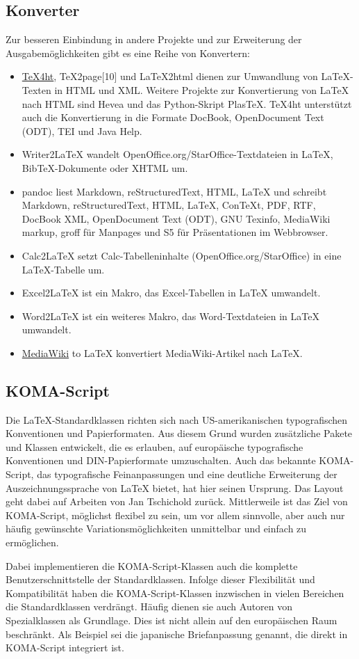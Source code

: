 \subsection{Konverter}
Zur besseren Einbindung in andere Projekte und zur Erweiterung der Ausgabemöglichkeiten gibt es eine Reihe von Konvertern:
\begin{itemize}
	\item \href{https://de.wikipedia.org/wiki/TeX4ht}{TeX4ht}, TeX2page[10] und LaTeX2html dienen zur Umwandlung von LaTeX-Texten in HTML und XML. Weitere Projekte zur Konvertierung von LaTeX nach HTML sind Hevea und das Python-Skript PlasTeX. TeX4ht unterstützt auch die Konvertierung in die Formate DocBook, OpenDocument Text (ODT), TEI und Java Help.
	\item Writer2LaTeX wandelt OpenOffice.org/StarOffice-Textdateien in LaTeX, BibTeX-Dokumente oder XHTML um.
	\item pandoc liest Markdown, reStructuredText, HTML, LaTeX und schreibt Markdown, reStructuredText, HTML, LaTeX, ConTeXt, PDF, RTF, DocBook XML, OpenDocument Text (ODT), GNU Texinfo, MediaWiki markup, groff für Manpages und S5 für Präsentationen im Webbrowser.\cite{pandoc}
	\item Calc2LaTeX setzt Calc-Tabelleninhalte (OpenOffice.org/StarOffice) in eine LaTeX-Tabelle um.
	\item Excel2LaTeX ist ein Makro, das Excel-Tabellen in LaTeX umwandelt.
	\item Word2LaTeX ist ein weiteres Makro, das Word-Textdateien in LaTeX umwandelt.
	\item \href{http://sourceforge.net/p/wb2pdf/git/ci/master/tree/}{MediaWiki} to LaTeX konvertiert MediaWiki-Artikel nach LaTeX.
\end{itemize}

\subsection{KOMA-Script}
Die LaTeX-Standardklassen richten sich nach US-amerikanischen typografischen Konventionen und Papierformaten. Aus diesem Grund wurden zusätzliche Pakete und Klassen entwickelt, die es erlauben, auf europäische typografische Konventionen und DIN-Papierformate umzuschalten. Auch das bekannte KOMA-Script, das typografische Feinanpassungen und eine deutliche Erweiterung der Auszeichnungssprache von LaTeX bietet, hat hier seinen Ursprung. Das Layout geht dabei auf Arbeiten von Jan Tschichold zurück. Mittlerweile ist das Ziel von KOMA-Script, möglichst flexibel zu sein, um vor allem sinnvolle, aber auch nur häufig gewünschte Variationsmöglichkeiten unmittelbar und einfach zu ermöglichen.

Dabei implementieren die KOMA-Script-Klassen auch die komplette Benutzerschnittstelle der Standardklassen. Infolge dieser Flexibilität und Kompatibilität haben die KOMA-Script-Klassen inzwischen in vielen Bereichen die Standardklassen verdrängt. Häufig dienen sie auch Autoren von Spezialklassen als Grundlage. Dies ist nicht allein auf den europäischen Raum beschränkt. Als Beispiel sei die japanische Briefanpassung genannt, die direkt in KOMA-Script integriert ist.